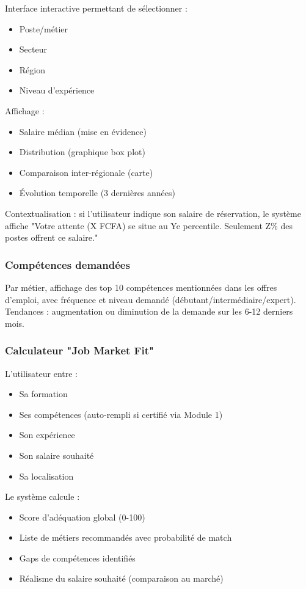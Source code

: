 \documentclass[12pt]{article}
\begin{document}
Interface interactive permettant de sélectionner :
\begin{itemize}
    \item Poste/métier
    \item Secteur
    \item Région
    \item Niveau d'expérience
\end{itemize}

Affichage :
\begin{itemize}
    \item Salaire médian (mise en évidence)
    \item Distribution (graphique box plot)
    \item Comparaison inter-régionale (carte)
    \item Évolution temporelle (3 dernières années)
\end{itemize}

Contextualisation : si l'utilisateur indique son salaire de réservation, le système affiche "Votre attente (X FCFA) se situe au Ye percentile. Seulement Z\% des postes offrent ce salaire."

\subsubsection{Compétences demandées}

Par métier, affichage des top 10 compétences mentionnées dans les offres d'emploi, avec fréquence et niveau demandé (débutant/intermédiaire/expert). Tendances : augmentation ou diminution de la demande sur les 6-12 derniers mois.

\subsubsection{Calculateur "Job Market Fit"}

L'utilisateur entre :
\begin{itemize}
    \item Sa formation
    \item Ses compétences (auto-rempli si certifié via Module 1)
    \item Son expérience
    \item Son salaire souhaité
    \item Sa localisation
\end{itemize}

Le système calcule :
\begin{itemize}
    \item Score d'adéquation global (0-100)
    \item Liste de métiers recommandés avec probabilité de match
    \item Gaps de compétences identifiés
    \item Réalisme du salaire souhaité (comparaison au marché)
\end{itemize}
\end{document}
